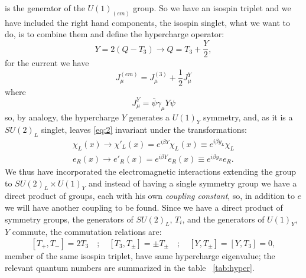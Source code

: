 is the generator of the $U(1)_{(em)}$ group. So we have an isospin triplet and
we have included the right hand components, the isospin singlet, what we want to
do, is to combine them and define the hypercharge operator:
\begin{equation}
  \label{eq:6}
  Y = 2 ( Q - T_{3}) \rightarrow Q = T_{3} + \frac{Y}{2},
\end{equation}
for the current we have
\begin{equation}
  \label{eq:7}
  J_{\mu}^{(em)} = J_{\mu}^{(3)} + \frac{1}{2} J_{\mu}^{Y}
\end{equation}
where
\begin{equation}
  \label{eq:8}
  J_{\mu}^{Y} = \bar{\psi} \gamma_{\mu} Y \psi
\end{equation}
so, by analogy, the hypercharge $Y$ generates a $U(1)_{Y}$ symmetry, and, as it
is a $SU(2)_{L}$ singlet, leaves \eqref{eq:2} invariant under the
transformations:
\begin{equation}
  \label{eq:9}
  \begin{split}
    \chi_{L}(x) \rightarrow \chi'_{L}(x) = e^{i \beta Y} \chi_{L}(x)
    \equiv e^{i \beta y_{L}} \chi_{L} \\
    e_{R}(x) \rightarrow e'_{R}(x) = e^{i \beta Y}e_{R}(x) \equiv e^{i \beta
      y_{R}}e_{R}.
  \end{split}
\end{equation}
We thus have incorporated the electromagnetic interactions extending the group
to $SU(2)_{L} \times U(1)_{Y}$ and instead of having a single symmetry group we
have a direct product of groups, each with his own \emph{coupling constant}, so,
in addition to $e$ we will have another coupling to be found.  Since we have a
direct product of symmetry groups, the generators of $SU(2)_{L}$, $T_{i}$, and
the generators of $U(1)_{Y}$, $Y$ commute, the commutation relations are:
\begin{equation}
  \label{eq:10}
  [T_{+},T_{-}] = 2 T_{3} \quad ; \quad [T_{3},T_{\pm}] = \pm T_{\pm}
  \quad ; \quad [Y,T_{\pm}] = [Y,T_{3}] = 0,
\end{equation}
member of the same isospin triplet, have same hypercharge eigenvalue; the
relevant quantum numbers are summarized in the table ~\ref{tab:hyper}.
